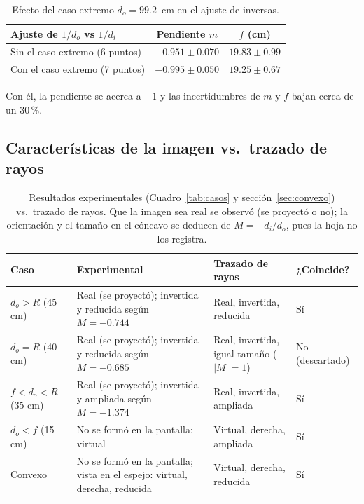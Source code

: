 \documentclass[11pt,a4paper]{article}
\begin{document}
\begin{table}[H]
\centering
\begin{tabular}{lcc}
\toprule
\textbf{Ajuste de $1/d_o$ vs $1/d_i$} & \textbf{Pendiente $m$} & $f$ (cm) \\
\midrule
Sin el caso extremo (6 puntos) & $-0.951 \pm 0.070$ & $19.83 \pm 0.99$ \\
Con el caso extremo (7 puntos) & $-0.995 \pm 0.050$ & $19.25 \pm 0.67$ \\
\bottomrule
\end{tabular}
\caption{Efecto del caso extremo $d_o = 99.2$~cm en el ajuste de inversas.}
\end{table}
\noindent Con él, la pendiente se acerca a $-1$ y las incertidumbres de $m$ y $f$ bajan cerca de un 30\,\%.

\subsection{Características de la imagen vs.\ trazado de rayos}
\label{sec:comparacion}

\begin{table}[H]
\centering
\small
\begin{tabularx}{\linewidth}{lXXl}
\toprule
\textbf{Caso} & \textbf{Experimental} & \textbf{Trazado de rayos} & \textbf{¿Coincide?} \\
\midrule
$d_o > R$ (45 cm) & Real (se proyectó); invertida y reducida según $M = -0.744$ & Real, invertida, reducida & Sí \\
$d_o = R$ (40 cm) & Real (se proyectó); invertida y reducida según $M = -0.685$ & Real, invertida, igual tamaño ($|M| = 1$) & No (descartado) \\
$f < d_o < R$ (35 cm) & Real (se proyectó); invertida y ampliada según $M = -1.374$ & Real, invertida, ampliada & Sí \\
$d_o < f$ (15 cm) & No se formó en la pantalla: virtual & Virtual, derecha, ampliada & Sí \\
Convexo & No se formó en la pantalla; vista en el espejo: virtual, derecha, reducida & Virtual, derecha, reducida & Sí \\
\bottomrule
\end{tabularx}
\caption{Resultados experimentales (Cuadro~\ref{tab:casos} y sección~\ref{sec:convexo}) vs.\ trazado de rayos. Que la imagen sea real se observó (se proyectó o no); la orientación y el tamaño en el cóncavo se deducen de $M = -d_i/d_o$, pues la hoja no los registra.}
\end{table}
\end{document}
